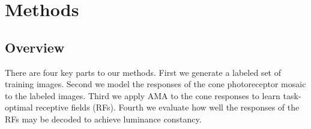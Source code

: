 \documentclass{jov}
\begin{document}

\section*{Methods} \label{Methods}
\subsection{Overview}
There are four key parts to our methods.  First we generate a labeled set of training images.  Second we model the responses of the cone photoreceptor mosaic to the labeled images. Third we apply AMA to the cone responses to learn task-optimal receptive fields (RFs).  Fourth we evaluate how well the responses of the RFs may be decoded to achieve luminance constancy.
\end{document}
